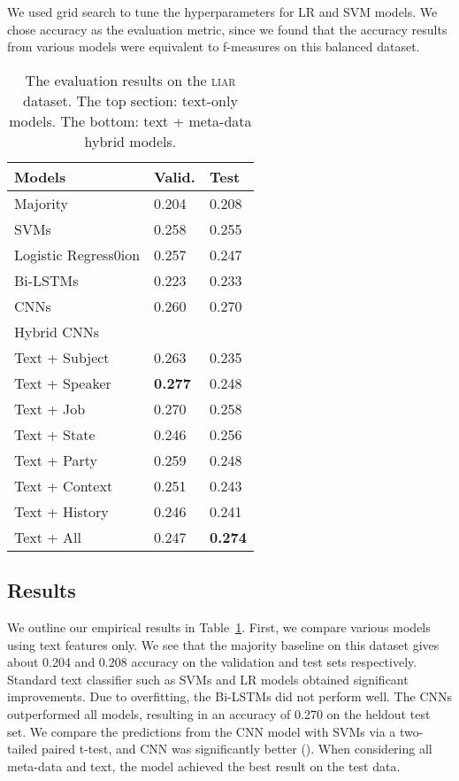 \documentclass[11pt,a4paper]{article}
\begin{document}
We used grid search to tune the hyperparameters for LR and SVM models. We chose accuracy as the evaluation metric, since we found that the accuracy results from various models were equivalent to f-measures on this balanced dataset.
\begin{table}[t]
\begin{center}
\begin{tabular}{lll}

\hline
Models & Valid. & Test\\
\hline
Majority & 0.204 & 0.208\\
SVMs & 0.258 & 0.255\\
Logistic Regress0ion & 0.257 & 0.247\\
Bi-LSTMs & 0.223 & 0.233\\
CNNs & 0.260 & 0.270\\
\hline
Hybrid CNNs& &\\
Text + Subject & 0.263 & 0.235\\
Text + Speaker & \textbf{0.277} & 0.248\\
Text + Job & 0.270 & 0.258\\
Text + State & 0.246 & 0.256\\
Text + Party & 0.259 & 0.248\\
Text + Context & 0.251 & 0.243\\
Text + History & 0.246 & 0.241\\
Text + All & 0.247 & \textbf{0.274}\\
\hline
\end{tabular}
\caption{The evaluation results on the \textsc{liar} dataset. The top section: text-only models. The bottom: text + meta-data hybrid models.}
\label{tab:eval}
\end{center}
\end{table}

\subsection{Results}
We outline our empirical results in Table~\ref{tab:eval}.
First, we compare various models using text features only.
We see that the majority baseline on this dataset gives about 0.204 and 0.208 accuracy on the validation and test sets respectively. 
Standard text classifier such as SVMs and LR models obtained significant improvements. Due to overfitting, the Bi-LSTMs did not perform well. The CNNs outperformed all models, resulting in an accuracy of 0.270 on the heldout test set. We compare the predictions from the CNN model with SVMs via a two-tailed paired t-test, and CNN was significantly better ().
When considering all meta-data and text, the model achieved the best result on the test data.
\end{document}
